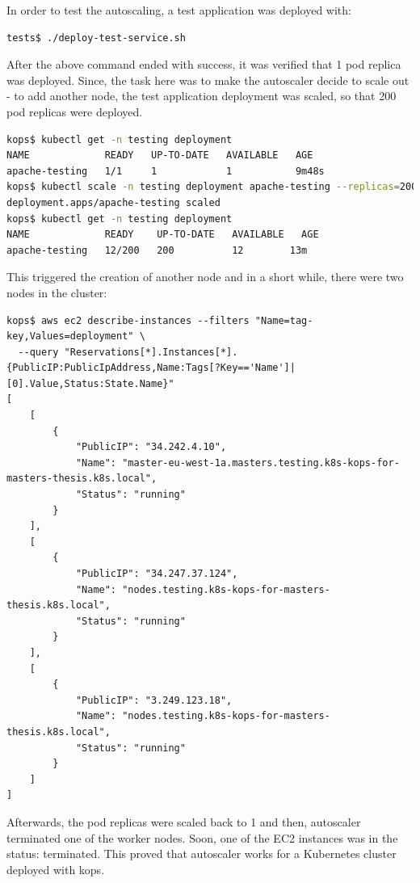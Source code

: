 In order to test the autoscaling, a test application was deployed with:
\begin{lstlisting}[basicstyle=\tiny,caption={Deploying a test application},captionpos=b,language=Bash,xleftmargin=1cm]
tests$ ./deploy-test-service.sh
\end{lstlisting}
After the above command ended with success, it was verified that 1 pod replica was deployed. Since, the task here was to make the autoscaler decide to scale out - to add another node, the test application deployment was scaled, so that 200 pod replicas were deployed.
\begin{lstlisting}[basicstyle=\tiny,caption={Scaling the test application pod replicas},captionpos=b,language=Bash,xleftmargin=1cm]
kops$ kubectl get -n testing deployment
NAME             READY   UP-TO-DATE   AVAILABLE   AGE
apache-testing   1/1     1            1           9m48s
kops$ kubectl scale -n testing deployment apache-testing --replicas=200
deployment.apps/apache-testing scaled
kops$ kubectl get -n testing deployment
NAME             READY    UP-TO-DATE   AVAILABLE   AGE
apache-testing   12/200   200          12        13m
\end{lstlisting}
This triggered the creation of another node and in a short while, there were two nodes in the cluster:
\begin{lstlisting}[basicstyle=\tiny,caption={Listing the EC2 instances, 1 of them was created by autoscaler}]
kops$ aws ec2 describe-instances --filters "Name=tag-key,Values=deployment" \
  --query "Reservations[*].Instances[*].{PublicIP:PublicIpAddress,Name:Tags[?Key=='Name']|[0].Value,Status:State.Name}"
[
    [
        {
            "PublicIP": "34.242.4.10",
            "Name": "master-eu-west-1a.masters.testing.k8s-kops-for-masters-thesis.k8s.local",
            "Status": "running"
        }
    ],
    [
        {
            "PublicIP": "34.247.37.124",
            "Name": "nodes.testing.k8s-kops-for-masters-thesis.k8s.local",
            "Status": "running"
        }
    ],
    [
        {
            "PublicIP": "3.249.123.18",
            "Name": "nodes.testing.k8s-kops-for-masters-thesis.k8s.local",
            "Status": "running"
        }
    ]
]
\end{lstlisting}
Afterwards, the pod replicas were scaled back to 1 and then, autoscaler terminated one of the worker nodes. Soon, one of the EC2 instances was in the status: terminated. This proved that autoscaler works for a Kubernetes cluster deployed with kops.

